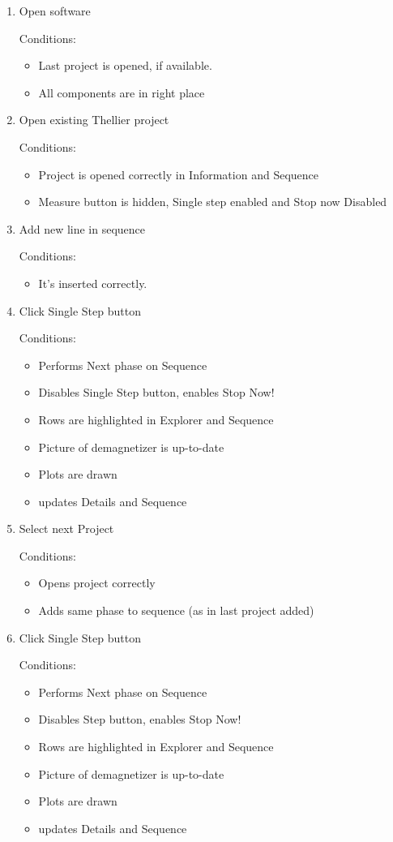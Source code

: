 \begin{enumerate}

\item Open software

Conditions:
\begin{itemize}
\item Last project is opened, if available.
\item All components are in right place
\end{itemize}

\item Open existing Thellier project

Conditions:
\begin{itemize}
\item Project is opened correctly in Information and Sequence
\item Measure button is hidden, Single step enabled and Stop now Disabled
\end{itemize}

\item Add new line in sequence

Conditions:
\begin{itemize}
\item It's inserted correctly.
\end{itemize}

\item Click Single Step button

Conditions:
\begin{itemize}
\item Performs Next phase on Sequence
\item Disables Single Step button, enables Stop Now!
\item Rows are highlighted in Explorer and Sequence
\item Picture of demagnetizer is up-to-date
\item Plots are drawn
\item updates Details and Sequence
\end{itemize}

\item Select next Project

Conditions:
\begin{itemize}
\item Opens project correctly
\item Adds same phase to sequence (as in last project added)
\end{itemize}

\item Click Single Step button

Conditions:
\begin{itemize}
\item Performs Next phase on Sequence
\item Disables Step button, enables Stop Now!
\item Rows are highlighted in Explorer and Sequence
\item Picture of demagnetizer is up-to-date
\item Plots are drawn
\item updates Details and Sequence
\end{itemize}

\end{enumerate}